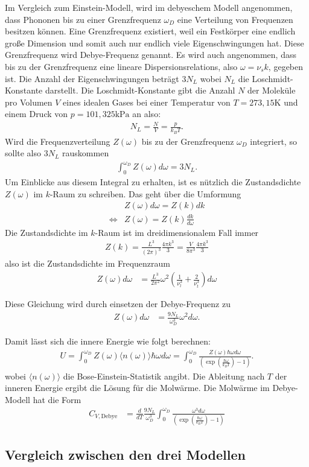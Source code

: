 Im Vergleich zum Einstein-Modell, wird im debyeschem Modell angenommen, dass Phononen bis zu einer Grenzfrequenz $\omega_D$ eine Verteilung von Frequenzen besitzen können. 
Eine Grenzfrequenz existiert, weil ein Festkörper eine endlich große Dimension und somit auch nur endlich viele Eigenschwingungen hat. Diese Grenzfrequenz wird Debye-Frequenz genannt. Es wird auch angenommen, 
dass bis zu der Grenzfrequenz eine lineare Dispersionsrelations, also $\omega = \nu_s k$, gegeben ist. 
Die Anzahl der Eigenschwingungen beträgt $3 N_L$ wobei $N_L$ die Loschmidt-Konstante darstellt. Die Loschmidt-Konstante gibt die Anzahl $N$ der Moleküle pro Volumen $V$ eines idealen Gases 
bei einer Temperatur von $T = 273,15 \si{\kelvin}$ und einem Druck von $p = 101,325 \si{\kilo\pascal}$ an also:
\begin{align*}
    N_L = \frac{N}{V} = \frac{p}{k_B T}.
\end{align*}
Wird die Frequenzverteilung $Z(\omega)$ bis zu der Grenzfrequenz $\omega_D$ integriert, so sollte also $3 N_L$ rauskommen
\begin{align*}
    \int_0^{\omega_D} Z(\omega) d\omega = 3 N_L .
\end{align*}
Um Einblicke aus diesem Integral zu erhalten, ist es nützlich die Zustandsdichte $Z(\omega)$ im $k$-Raum zu schreiben. Das geht über die Umformung 
\begin{align*}
    &Z(\omega) d\omega = Z(k) d k\\
    \Leftrightarrow& Z(\omega) = Z(k) \frac{d k}{d\omega}
\end{align*}
Die Zustandsdichte im $k$-Raum ist im dreidimensionalem Fall immer 
\begin{align*}
    Z(k) = \frac{L^3}{\left(2 \pi\right)^3} \frac{4 \pi k^3}{3} = \frac{V}{8 \pi^3} \frac{4 \pi k^3}{3}
\end{align*}
also ist die Zustandsdichte im Frequenzraum
\begin{align*}
    Z(\omega) d \omega&= \frac{L^3}{2 \pi^2} \omega^2 \left(\frac{1}{\nu^3_l} + \frac{2}{\nu^3_t}\right)  d\omega 
\end{align*}

Diese Gleichung wird durch einsetzen der Debye-Frequenz zu
\begin{align*}
    Z(\omega) d \omega&= \frac{9 N_L}{\omega_D^3} \omega^2 d \omega.
\end{align*}

Damit lässt sich die innere Energie wie folgt berechnen:
\begin{align*}
    U =  \int_0^{\omega_D} Z(\omega) \langle n(\omega)\rangle \hbar \omega d \omega=  \int_0^{\omega_D} \frac{Z(\omega) \hbar \omega d \omega}{\left(\exp \left(\frac{\hbar \omega}{k_B T}\right) -1 \right)}.
\end{align*}
wobei $\langle n(\omega)\rangle$ die Bose-Einstein-Statistik angibt. Die Ableitung nach $T$ der inneren Energie ergibt die Lösung für die Molwärme. Die Molwärme im Debye-Modell hat die Form
\begin{align*}
    C_{V,\text{Debye}}&= \frac{d}{d T}\frac{9 N_L}{\omega_D^3} \int_0^{\omega_D} \frac{\omega^3 d\omega}{\left(\exp \left(\frac{\hbar \omega}{k_B T}\right) -1 \right)}
\end{align*}
\subsection{Vergleich zwischen den drei Modellen}